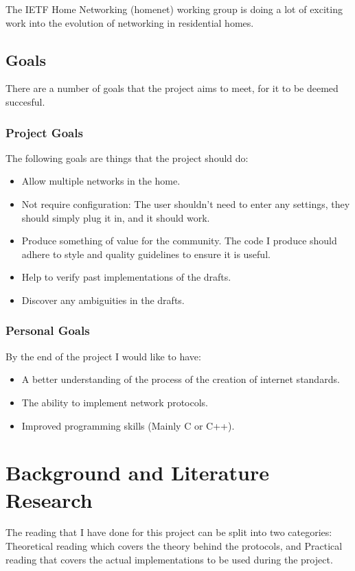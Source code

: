 \documentclass[12pt]{report}
\begin{document}
The IETF Home Networking (homenet) working group is doing a lot of exciting work
into the evolution of networking in residential homes. 

\section{Goals}

There are a number of goals that the project aims to meet, for it to be deemed
succesful.

\subsection{Project Goals }
The following goals are things that the project should do:

\begin{itemize}
	\item Allow multiple networks in the home. 
	\item Not require configuration: The user shouldn't need to enter any 
	settings, they should simply plug it in, and it should  work.
	\item Produce something of value for the community. The code I produce  
	should adhere to style and quality guidelines to ensure it is useful.
	\item Help to verify past implementations of the drafts.
	\item Discover any ambiguities in the drafts.
\end{itemize}

\subsection{Personal Goals}
By the end of the project I would like to have:

\begin{itemize}
	\item A better understanding of the process of the creation of internet
	standards.
	\item The ability to implement network protocols. 
	\item Improved programming skills (Mainly C or C++).
\end{itemize}

\chapter{Background and Literature Research}
The reading that I have done for this project can be split into two categories:
Theoretical reading which covers the theory behind the protocols, and Practical 
reading that covers the actual implementations to be used during the project.
\end{document}
